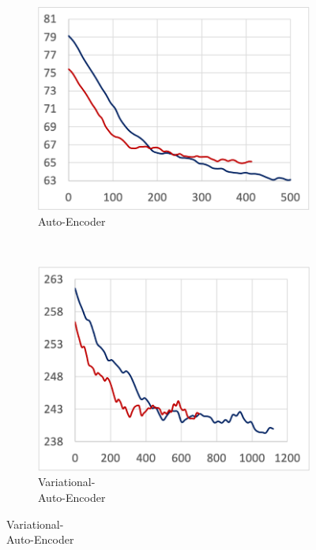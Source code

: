\begin{figure}[!ht]
\begin{subfigure}[t]{.22\textwidth}
    \includegraphics[width=\textwidth]{tf2-11}
    \caption{\small Auto-Encoder}
  \end{subfigure}
  ~
  \begin{subfigure}[t]{.22\textwidth}
    \includegraphics[width=\textwidth]{tf2-12}
    \caption{\small Variational-\\Auto-Encoder}
  \end{subfigure}
  
  \par\bigskip


\end{figure}
